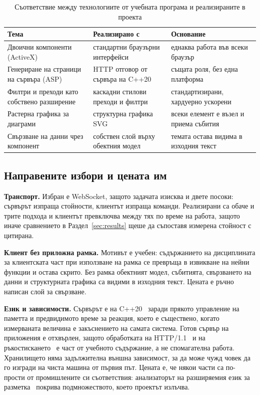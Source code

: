 \begin{table}[H]
\caption{Съответствие между технологиите от учебната програма и реализираните в проекта}
\label{tab:tech-mapping}
\centering
\fontsize{11}{13.2}\selectfont
\begin{tabular}{@{}L{4.2cm}L{4.4cm}L{4.4cm}@{}}
\toprule
\textbf{Тема} & \textbf{Реализирано с} & \textbf{Основание} \\
\midrule
Двоични компоненти (ActiveX) & стандартни браузърни интерфейси & еднаква работа във всеки браузър \\
Генериране на страници на сървъра (ASP) & HTTP отговор от сървъра на C++20 & същата роля, без една платформа \\
Филтри и преходи като собствено разширение & каскадни стилови преходи и филтри & стандартизирани, хардуерно ускорени \\
Растерна графика за диаграми & структурна графика SVG~\cite{svg2} & всеки елемент е възел и приема събития \\
Свързване на данни чрез компонент & собствен слой върху обектния модел~\cite{dom_ls} & темата остава видима в изходния текст \\
\bottomrule
\end{tabular}
\end{table}

\subsection{Направените избори и цената им}

\textbf{Транспорт.} Избран е WebSocket, защото задачата изисква и двете посоки: сървърът
изпраща стойности, клиентът изпраща команди. Реализирани са обаче и трите подхода и клиентът
превключва между тях по време на работа, защото иначе сравнението в Раздел~\ref{sec:results}
щеше да съпоставя измерена стойност с цитирана.

\textbf{Клиент без приложна рамка.} Мотивът е учебен: съдържанието на дисциплината за
клиентската част при използване на рамка се превръща в извикване на нейни функции и остава
скрито. Без рамка обектният модел, събитията, свързването на данни и структурната графика са
видими в изходния текст. Цената е ръчно написан слой за свързване.

\textbf{Език и зависимости.} Сървърът е на C++20~\cite{iso_cpp20} заради прякото управление
на паметта и предвидимото време за реакция, което е съществено, когато измерваната величина е
закъснението на самата система. Готов сървър на приложения е отхвърлен, защото обработката на
HTTP/1.1~\cite{rfc9112} и на ръкостискането~\cite{rfc6455} е част от учебното съдържание, а не
спомагателна работа. Хранилището няма задължителна външна зависимост, за да може чужд човек да
го изгради на чиста машина от първия път. Цената е, че някои части са по-прости от
промишлените си съответствия: анализаторът на разширяемия език за разметка~\cite{xml10} покрива
подмножеството, което проектът излъчва.
